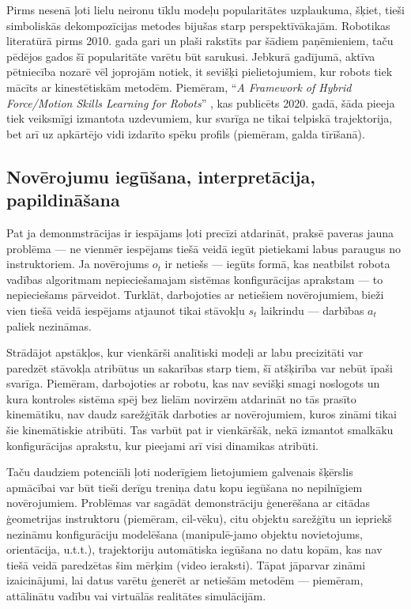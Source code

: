 \documentclass[12pt, a4paper]{article}
\numberwithin{equation}{section} %
\begin{document}
Pirms nesenā ļoti lielu neironu tīklu modeļu popularitātes uzplaukuma, šķiet, tieši simboliskās dekompozīcijas metodes bijušas starp perspektīvākajām. Robotikas literatūrā pirms 2010. gada \cite{billard2008handbook} gari un plaši rakstīts par šādiem paņēmieniem, taču pēdējos gados šī popularitāte varētu būt sarukusi. Jebkurā gadījumā, aktīva pētniecība nozarē vēl joprojām notiek, it sevišķi pielietojumiem, kur robots tiek mācīts ar kinestētiskām metodēm. Piemēram, ``\textit{A Framework of Hybrid Force/Motion Skills Learning for Robots}'' \cite{wang2020framework}, kas publicēts 2020. gadā, šāda pieeja tiek veiksmīgi izmantota uzdevumiem, kur svarīga ne tikai telpiskā trajektorija, bet arī uz apkārtējo vidi izdarīto spēku profils (piemēram, galda tīrīšanā).


\subsection{Novērojumu iegūšana, interpretācija, papildināšana}

Pat ja demonmstrācijas ir iespājams ļoti precīzi atdarināt, praksē paveras jauna problēma --- ne vienmēr iespējams tiešā veidā iegūt pietiekami labus paraugus no instruktoriem. Ja novērojums $o_t$ ir netiešs --- iegūts formā, kas neatbilst robota vadības algoritmam nepieciešamajam sistēmas konfigurācijas aprakstam --- to nepieciešams pārveidot. Turklāt, darbojoties ar netiešiem novērojumiem, bieži vien tiešā veidā iespējams atjaunot tikai stāvokļu $s_t$ laikrindu --- darbības $a_t$ paliek nezināmas.

Strādājot apstākļos, kur vienkārši analītiski modeļi ar labu precizitāti var paredzēt stāvokļa atribūtus un sakarības starp tiem, šī atšķirība var nebūt īpaši svarīga. Piemēram, darbojoties ar robotu, kas nav sevišķi smagi noslogots un kura kontroles sistēma spēj bez lielām novirzēm atdarināt no tās prasīto kinemātiku, nav daudz sarežģītāk darboties ar novērojumiem, kuros zināmi tikai šie kinemātiskie atribūti. Tas varbūt pat ir vienkāršāk, nekā izmantot smalkāku konfigurācijas aprakstu, kur pieejami arī visi dinamikas atribūti. 

Taču daudziem potenciāli ļoti noderīgiem lietojumiem galvenais šķērslis apmācībai var būt tieši derīgu treniņa datu kopu iegūšana no nepilnīgiem novērojumiem. Problēmas var sagādāt demonstrāciju ģenerēšana ar citādas ģeometrijas instruktoru (piemēram, cil-vēku), citu objektu sarežģītu un iepriekš nezināmu konfigurāciju modelēšana (manipulē-jamo objektu novietojums, orientācija, u.t.t.), trajektoriju automātiska iegūšana no datu kopām, kas nav tiešā veidā paredzētas šim mērķim (video ieraksti). Tāpat jāparvar zināmi izaicinājumi, lai datus varētu ģenerēt ar netiešām metodēm --- piemēram, attālinātu vadību vai virtuālās realitātes simulācijām.
\end{document}
